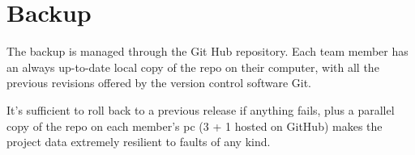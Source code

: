 \section{Backup}
The backup is managed through the Git Hub repository. Each team member has an always up-to-date local copy of the repo on their computer, with all the previous revisions offered by the version control software Git.

It's sufficient to roll back to a previous release if anything fails, plus a parallel copy of the repo on each member's pc (3 + 1 hosted on GitHub) makes the project data extremely resilient to faults of any kind.

\pagebreak